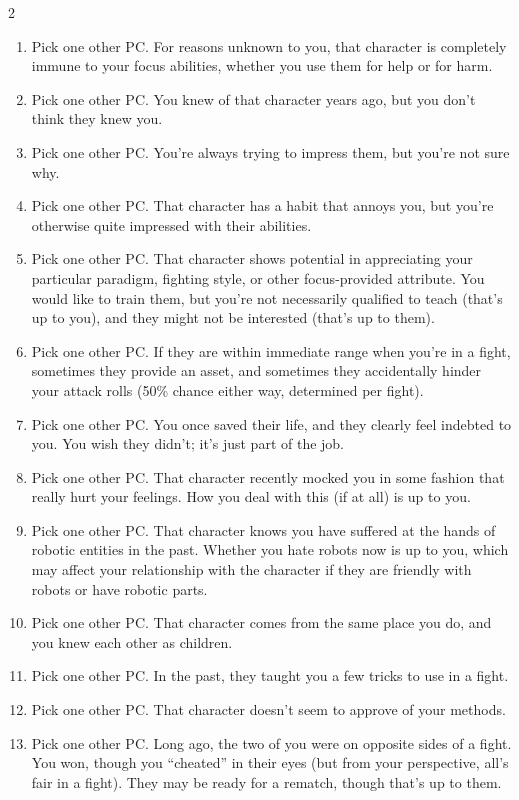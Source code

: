 \begin{multicols}{2}
\begin{enumerate}
\item Pick one other PC. For reasons unknown to you, that character is completely immune to your focus abilities, whether you use them for help or for harm.
\item Pick one other PC. You knew of that character years ago, but you don’t think they knew you.
\item Pick one other PC. You’re always trying to impress them, but you’re not sure why. 
\item Pick one other PC. That character has a habit that annoys you, but you’re otherwise quite impressed with their abilities.
\item Pick one other PC. That character shows potential in appreciating your particular paradigm, fighting style, or other
focus-provided attribute. You would like to train them, but you’re not necessarily qualified to teach (that’s up to you), and they might not be interested (that’s up to them).
\item Pick one other PC. If they are within immediate range when you’re in a fight, sometimes they provide an asset, and sometimes they accidentally hinder your attack rolls (50\% chance either way, determined per fight).
\item Pick one other PC. You once saved their life, and they clearly feel indebted to you. You wish they didn’t; it’s just part of the job.
\item Pick one other PC. That character recently mocked you in some fashion that really hurt your feelings. How you deal with this (if at all) is up to you.
\item Pick one other PC. That character knows you have suffered at the hands of robotic entities in the past. Whether you hate robots now is up to you, which may affect your relationship with the character if they are friendly with robots or have robotic parts.
\item Pick one other PC. That character comes from the same place you do, and you knew each other as children.
\item Pick one other PC. In the past, they taught you a few tricks to use in a fight.
\item Pick one other PC. That character doesn’t seem to approve of your methods.
\item Pick one other PC. Long ago, the two of you were on opposite sides of a fight. You won, though you “cheated” in their eyes (but from your perspective, all’s fair in a fight). They may be ready for a rematch, though that’s up to them.

\end{enumerate}
\end{multicols}
